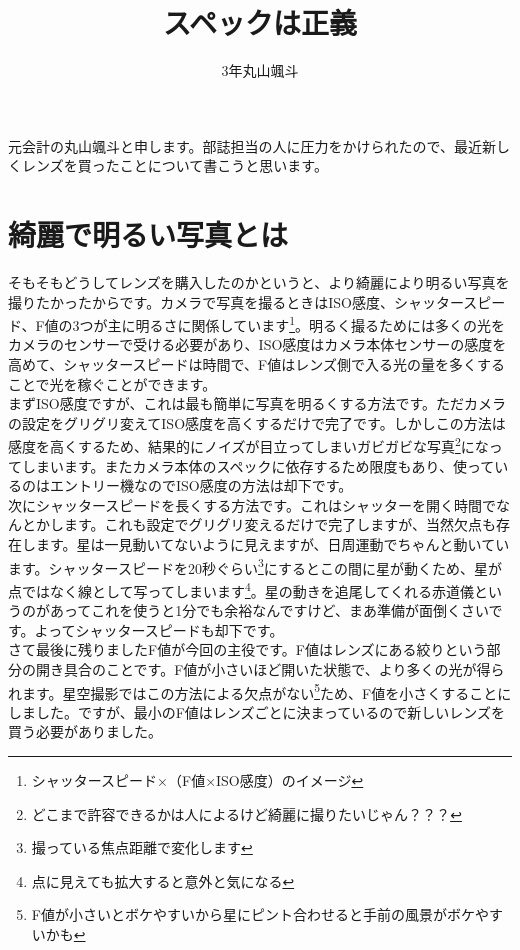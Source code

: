\documentclass[a4paper.10pt]{jarticle}
\begin{document}
\title{スペックは正義}
\author{3年丸山颯斗}
\date{}
\maketitle

元会計の丸山颯斗と申します。部誌担当の人に圧力をかけられたので、最近新しくレンズを買ったことについて書こうと思います。\\
\section{綺麗で明るい写真とは}
そもそもどうしてレンズを購入したのかというと、より綺麗により明るい写真を撮りたかったからです。カメラで写真を撮るときはISO感度、シャッタースピード、F値の3つが主に明るさに関係しています\footnote{シャッタースピード×（F値×ISO感度）のイメージ}。明るく撮るためには多くの光をカメラのセンサーで受ける必要があり、ISO感度はカメラ本体センサーの感度を高めて、シャッタースピードは時間で、F値はレンズ側で入る光の量を多くすることで光を稼ぐことができます。\\
まずISO感度ですが、これは最も簡単に写真を明るくする方法です。ただカメラの設定をグリグリ変えてISO感度を高くするだけで完了です。しかしこの方法は感度を高くするため、結果的にノイズが目立ってしまいガビガビな写真\footnote{どこまで許容できるかは人によるけど綺麗に撮りたいじゃん？？？}になってしまいます。またカメラ本体のスペックに依存するため限度もあり、使っているのはエントリー機なのでISO感度の方法は却下です。\\
次にシャッタースピードを長くする方法です。これはシャッターを開く時間でなんとかします。これも設定でグリグリ変えるだけで完了しますが、当然欠点も存在します。星は一見動いてないように見えますが、日周運動でちゃんと動いています。シャッタースピードを20秒ぐらい\footnote{撮っている焦点距離で変化します}にするとこの間に星が動くため、星が点ではなく線として写ってしまいます\footnote{点に見えても拡大すると意外と気になる}。星の動きを追尾してくれる赤道儀というのがあってこれを使うと1分でも余裕なんですけど、まあ準備が面倒くさいです。よってシャッタースピードも却下です。\\
さて最後に残りましたF値が今回の主役です。F値はレンズにある絞りという部分の開き具合のことです。F値が小さいほど開いた状態で、より多くの光が得られます。星空撮影ではこの方法による欠点がない\footnote{F値が小さいとボケやすいから星にピント合わせると手前の風景がボケやすいかも}ため、F値を小さくすることにしました。ですが、最小のF値はレンズごとに決まっているので新しいレンズを買う必要がありました。
\end{document}
